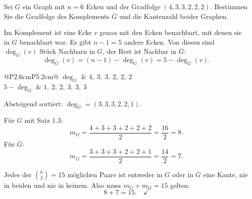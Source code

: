 \begin{aufgabe}
Sei $G$ ein Graph mit $n = 6$ Ecken und der Gradfolge $(4,3,3,2,2,2)$. Bestimmen Sie die Gradfolge des Komplements $\overline{G}$ und die Kantenzahl beider Graphen.

\loesung
{}
Im Komplement ist eine Ecke $v$ genau mit den Ecken benachbart, mit denen sie in $G$  benachbart war. Es gibt $n - 1 = 5$ andere Ecken. Von diesen sind $\deg_G(v)$ Stück Nachbarn in $G$, der Rest ist Nachbar in $\overline{G}$:
\[ \deg_{\overline{G}}(v) = (n-1) - \deg_G(v) = 5 - \deg_G(v) . \]

\begin{center}
\renewcommand{\arraystretch}{1.4}
\begin{tabular}{@{}P{2.6cm}P{5.2cm}@{}}
\toprule
$\deg_G$ & $4,\ 3,\ 3,\ 2,\ 2,\ 2$\\
$5 - \deg_G$ & $1,\ 2,\ 2,\ 3,\ 3,\ 3$\\
\bottomrule
\end{tabular}
\end{center}
Absteigend sortiert: $\deg_{\overline{G}} = (3,3,3,2,2,1)$.

Für $G$ mit Satz 1.3:
\[ m_G = \frac{4+3+3+2+2+2}{2} = \frac{16}{2} = 8 . \]
Für $\overline{G}$:
\[ m_{\overline{G}} = \frac{3+3+3+2+2+1}{2} = \frac{14}{2} = 7 . \]

Jedes der $\binom{6}{2} = 15$ möglichen Paare ist entweder in $G$ oder in $\overline{G}$ eine Kante, nie in beiden und nie in keinem. Also muss $m_G + m_{\overline{G}} = 15$ gelten:
\[ 8 + 7 = 15 . \quad \checkmark \]
\end{aufgabe}

